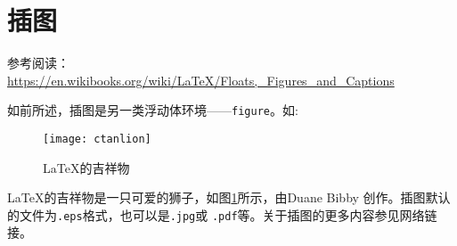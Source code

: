 \section{插图}

参考阅读：\url{https://en.wikibooks.org/wiki/LaTeX/Floats,_Figures_and_Captions}

如前所述，插图是另一类浮动体环境——\texttt{figure}。如:
\begin{codeout}
\begin{figure}[H]
  \begin{center} \texttt{[image: ctanlion]}
  \caption{\LaTeX{}的吉祥物}
  \label{fig:lion}
  \end{center}
\end{figure}
\end{codeout}

\LaTeX{}的吉祥物是一只可爱的狮子，如图\ref{fig:lion}所示，由Duane Bibby
创作。插图默认的文件为\texttt{.eps}格式，也可以是\texttt{.jpg}或
\texttt{.pdf}等。关于插图的更多内容参见网络链接。

